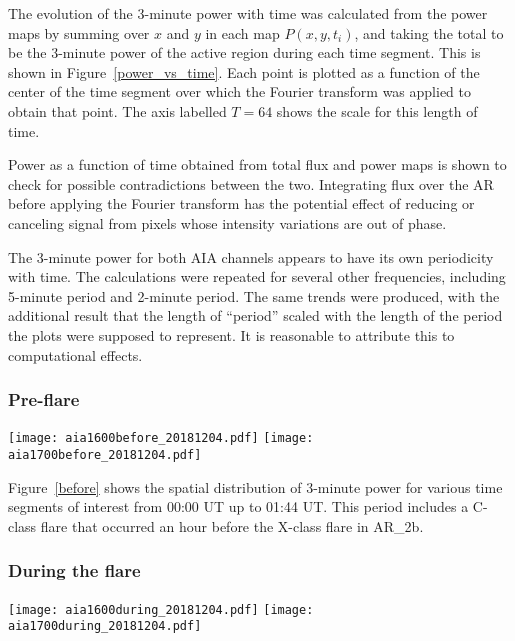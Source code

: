 The evolution of the 3-minute power with time
was calculated from the power maps
by summing over $x$ and $y$ in each map $P(x,y,t_{i})$, and taking the total
to be the 3-minute power of the active region during each time segment.
This is shown in
\myfig Figure~\ref{power_vs_time}.
Each point is plotted as a function of the center of the time segment
over which the Fourier transform was applied to obtain that point.
The axis labelled $T=64$ shows the scale for this length of time.

Power as a function of time obtained from total flux and power maps
is shown to check for possible contradictions between the two.
Integrating flux over the AR
before applying the Fourier transform
has the potential effect of reducing or canceling signal from
pixels whose intensity variations are out of phase.

The 3-minute power for both AIA channels
appears to have its own periodicity with time.
The calculations were repeated for several other frequencies, including
5-minute period and 2-minute period.
The same trends were produced, with the additional result
that the length of ``period'' scaled with the length of the period
the plots were supposed to represent.
It is reasonable to attribute this to computational effects.

\subsubsection{Pre-flare}

\begin{figure*}[htb!]\centering
    \texttt{[image: aia1600before\_20181204.pdf]}
    \texttt{[image: aia1700before\_20181204.pdf]}
    \caption{%
        Spatial distribution of 3-minute power before the X-class flare,
        in log scale to bridge large contrasts.
        Locations whose time segment included saturated pixels were set to zero.
        \label{before}}
\end{figure*}

\myfig Figure~\ref{before} shows the spatial distribution of 3-minute power for
various time segments of interest from 00:00 UT up to 01:44 UT.
This period includes a C-class flare that occurred an hour before the
X-class flare in AR\_2b.

\subsubsection{During the flare}
\begin{figure*}[htb!]\centering
    \texttt{[image: aia1600during\_20181204.pdf]}
    \texttt{[image: aia1700during\_20181204.pdf]}
    \caption{%
        Spatial distribution of 3-minute power during the X-class flare.
        \label{during}}
\end{figure*}


